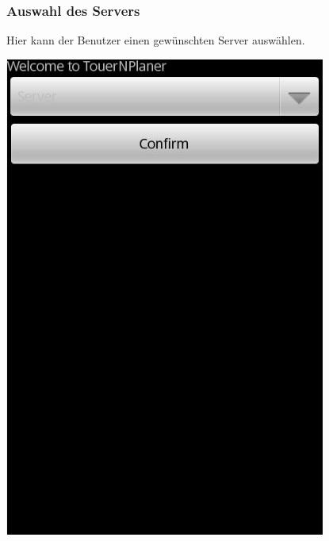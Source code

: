 \documentclass[a4paper,10pt,titlepage]{article}
\begin{document}
\subsubsection{Auswahl des Servers}
Hier kann der Benutzer einen gewünschten Server auswählen.
\begin {center}
\includegraphics[scale=0.40]{media/android/server.jpg}
\end {center}
\end{document}
